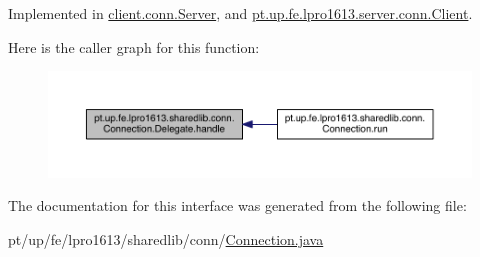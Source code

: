 Implemented in \hyperlink{classclient_1_1conn_1_1_server_a620def50e5115d3798407dfff5433ead}{client.\+conn.\+Server}, and \hyperlink{classpt_1_1up_1_1fe_1_1lpro1613_1_1server_1_1conn_1_1_client_a81efbd1e6b06189da5c814ac767a4a98}{pt.\+up.\+fe.\+lpro1613.\+server.\+conn.\+Client}.

Here is the caller graph for this function\+:
\nopagebreak
\begin{figure}[H]
\begin{center}
\leavevmode
\includegraphics[width=350pt]{interfacept_1_1up_1_1fe_1_1lpro1613_1_1sharedlib_1_1conn_1_1_connection_1_1_delegate_a5b0f77e34d93967ae53cf7e01f0e2835_icgraph}
\end{center}
\end{figure}


The documentation for this interface was generated from the following file\+:\begin{DoxyCompactItemize}
\item 
pt/up/fe/lpro1613/sharedlib/conn/\hyperlink{_connection_8java}{Connection.\+java}\end{DoxyCompactItemize}
